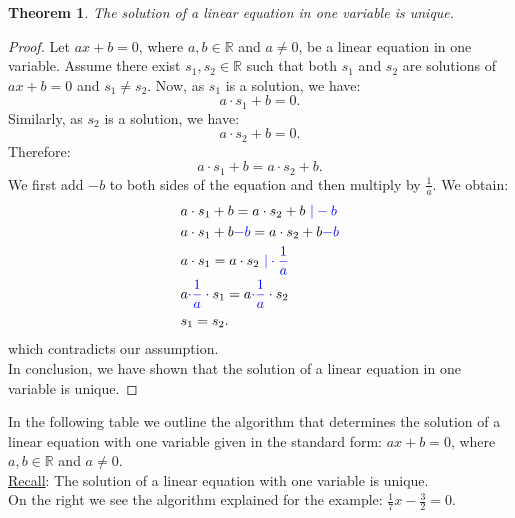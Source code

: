 \documentclass[12pt]{article}
\newtheorem{theorem}{Theorem}[section]
\begin{document}
\begin{theorem}
The solution of a linear equation in one variable is unique. 
\end{theorem}

\begin{proof}
Let $ax+b=0$, where $a,b\in \mathbb{R}$ and $a\neq 0$, be a linear equation in one variable. Assume there exist $s_{1}, s_{2} \in \mathbb{R}$ such that both $s_{1}$ and $s_{2}$ are solutions of $ax+b=0$ and $s_{1}\neq s_{2}$. Now, as $s_{1}$ is a solution, we have:
$$a\cdot s_{1}+b=0.$$
Similarly, as $s_{2}$ is a solution, we have:
$$a\cdot s_{2}+b=0.$$
Therefore: $$a\cdot s_{1}+b=a\cdot s_{2}+b.$$
We first add $-b$ to both sides of the equation and then multiply by $\frac{1}{a}$. We obtain: 
\begin{equation*}
\begin{split}
& a\cdot s_{1}+b=a\cdot s_{2}+b \textcolor{blue}{\ | -b}\\
& a\cdot s_{1}+b\textcolor{blue}{-b}=a\cdot s_{2}+b\textcolor{blue}{-b}\\
& a\cdot s_{1}=a\cdot s_{2} \textcolor{blue}{\ | \cdot \frac{1}{a}}\\
& a\textcolor{blue}{\cdot \frac{1}{a}}\cdot s_{1}=a\textcolor{blue}{\cdot \frac{1}{a}}\cdot s_{2}\\
& s_{1}=s_{2}.
\end{split}
\end{equation*}
which contradicts our assumption. \\
In conclusion, we have shown that the solution of a linear equation in one variable is unique.
\end{proof}

In the following table we outline the algorithm that determines the solution of a linear equation with one variable given in the standard form: $ax+b=0$, where $a, b\in \mathbb{R}$ and $a\neq 0$.\\
\underline{Recall}: The solution of a linear equation with one variable is unique.\\
On the right we see the algorithm explained for the example: $\frac{1}{7}x-\frac{3}{2}=0$.
\end{document}
